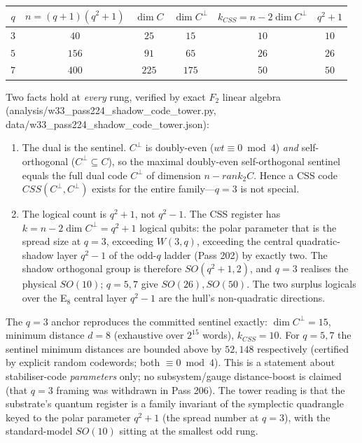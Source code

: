 \documentclass[12pt,a4paper]{article}
\def\mathrm#1{#1}%
\def\mathbf#1{#1}%
\def\textbf#1{#1}%
\def\texttt#1{#1}%
\theoremstyle{definition}
\begin{document}
\begin{center}
\begin{tabular}{c|ccccc}
$q$ & $n=(q{+}1)(q^2{+}1)$ & $\dim C$ & $\dim C^{\perp}$ & $k_{\mathrm{CSS}}=n-2\dim C^{\perp}$ & $q^2+1$ \\ \hline
$3$ & $40$  & $25$  & $15$  & $10$ & $10$ \\
$5$ & $156$ & $91$  & $65$  & $26$ & $26$ \\
$7$ & $400$ & $225$ & $175$ & $50$ & $50$
\end{tabular}
\end{center}

Two facts hold at \emph{every} rung, verified by exact $\mathbf{F}_2$ linear
algebra (\texttt{analysis/w33\_pass224\_shadow\_code\_tower.py},
\texttt{data/w33\_pass224\_shadow\_code\_tower.json}):

\begin{enumerate}
\item \textbf{The dual is the sentinel.} $C^{\perp}$ is doubly-even
  ($\mathrm{wt}\equiv 0 \bmod 4$) \emph{and} self-orthogonal
  ($C^{\perp}\subseteq C$), so the maximal doubly-even self-orthogonal
  sentinel equals the full dual code $C^{\perp}$ of dimension $n-\mathrm{rank}_2 C$.
  Hence a CSS code $\mathrm{CSS}(C^{\perp},C^{\perp})$ exists for the entire
  family---$q=3$ is not special.
\item \textbf{The logical count is $q^2+1$, not $q^2-1$.} The CSS register has
  $k=n-2\dim C^{\perp}=q^2+1$ logical qubits: the polar parameter that is
  the spread size at $q=3$, exceeding
  $W(3,q)$, exceeding the central quadratic-shadow layer $q^2-1$ of the odd-$q$
  ladder (Pass 202) by exactly two. The shadow orthogonal group is therefore
  $\mathrm{SO}(q^2+1,2)$, and $q=3$ realises the physical $\mathrm{SO}(10)$;
  $q=5,7$ give $\mathrm{SO}(26),\mathrm{SO}(50)$. The two surplus logicals over
  the E$_8$ central layer $q^2-1$ are the hull's non-quadratic directions.
\end{enumerate}

The $q=3$ anchor reproduces the committed sentinel exactly: $\dim C^{\perp}=15$,
minimum distance $d=8$ (exhaustive over $2^{15}$ words), $k_{\mathrm{CSS}}=10$.
For $q=5,7$ the sentinel minimum distances are bounded above by $52,148$
respectively (certified by explicit random codewords; both $\equiv 0 \bmod 4$).
This is a statement about stabiliser-code \emph{parameters} only; no
subsystem/gauge distance-boost is claimed (that $q=3$ framing was withdrawn in
Pass 206). The tower reading is that the substrate's quantum register is a
family invariant of the symplectic quadrangle keyed to the polar parameter
$q^2+1$ (the spread number at $q=3$), with
the standard-model $\mathrm{SO}(10)$ sitting at the smallest odd rung.
\end{document}
